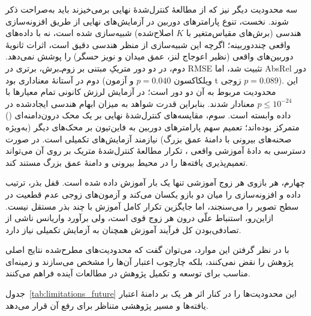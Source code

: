 سه محدودیت دیگر نیز که از مطالعهٔ کنترل‌شدهٔ نهایی برمی‌خیزند
باید به‌صراحت ذکر شوند.
نخست، تنوع پارامترهای دوربین در آزمایش‌های نهایی
از طریق افزونه‌سازی هندسی (برش‌های مقیاس‌متغیر با $K$ اصلاح‌شده)
شبیه‌سازی شده است، نه با داده‌های واقعی چنددوربینه؛
اگرچه این شبیه‌سازی از منظر هندسی دقیق است،
اثرات ثانویهٔ دوربین‌های واقعی
(نظیر اعوجاج لنز، عمق میدان و نویز حسگر)
را پوشش نمی‌دهد.
دوم، در دو دور متریکِ مبتنی بر زوم‌ـ‌برش، برتری \proposedmodel{}
در RMSE تثبیت شد، اما AbsRel دور دوم در آستانهٔ معناداری بود
(ویلکاکسون $p=0.040$ و آزمون t زوجی $p=0.089$).
این محدودیت مربوط به آن دو دور است؛ در آزمایش لرزش کانونی
تمام معیارها با $p\leq10^{-24}$ معنادار شدند. بنابراین قدرت شواهد
به میزان ابهام هندسی ایجادشده در داده وابسته است.
سوم، مقایسه‌های کنترل‌شدهٔ نهایی بر یک محک درون‌دامنه‌ای
() متمرکز بوده‌اند؛
تعمیم سهم پارامترهای دوربین به فاین‌تیون بر محک‌های دیگر
(به‌ویژه صحنه‌های بیرونی با دامنهٔ عمق بزرگ)
نیازمند آزمایش‌های تکمیلی است.
در صورت دسترسی به دادهٔ آموزشی واقعی ، تکرار مطالعهٔ کنترل‌شدهٔ متریک بر روی آن می‌تواند تعمیم‌پذیری یافته‌ها را در محیط بیرونی و دامنهٔ عمق بزرگ مستند کند.

چهارم، هر بازوی هر زوج آموزشی تنها یک بار آموزش داده شده است. قفل بذر، ترتیب داده و افزونه‌سازی را میان دو بازو یکسان می‌کند و آزمون‌های زوجی عدم قطعیت در سطح تصویر را می‌سنجند، اما جایگزین تکرار کامل آموزش با چند بذر مستقل نیست. ازاین‌رو، استنباط علّی درون هر زوج قوی است، ولی برآورد واریانس ناشی از تصادفی‌بودن کل فرآیند آموزش همچنان به آزمایش تکمیلی نیاز دارد.

با در نظر گرفتن این موارد،
می‌توان گفت که محدودیت‌های مطرح‌شده
نتایج اصلی پژوهش را نقض نمی‌کنند،
بلکه چارچوب اعتبار آن‌ها را مشخص می‌سازند
و زمینه‌ای مناسب
برای توسعه و تکمیل پژوهش
در مطالعات آینده فراهم می‌کنند.


جدول~\ref{tab:limitations_future} این محدودیت‌ها را در کنار اثر هر یک بر
دامنهٔ اعتبار یافته‌ها و مسیر پژوهشی متناظر برای رفع آن قرار می‌دهد.

